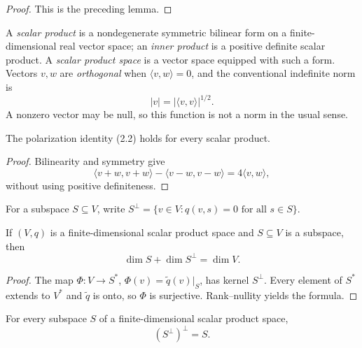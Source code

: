 \begin{proof}
\leanok
\sketch This is the preceding lemma.
\end{proof}

A \emph{scalar product} is a nondegenerate symmetric bilinear form on a
finite-dimensional real vector space; an \emph{inner product} is a positive
definite scalar product. A \emph{scalar product space} is a vector space equipped
with such a form. Vectors $v,w$ are \emph{orthogonal} when
$\langle v,w\rangle=0$, and the conventional indefinite norm is
\[
|v|=|\langle v,v\rangle|^{1/2}.
\]
A nonzero vector may be null, so this function is not a norm in the usual sense.

\begin{proposition}
\label{prop:polarization-scalar-product}
\leanok
{}
The polarization identity (2.2) holds for every scalar product.
\end{proposition}

\begin{proof}
\leanok
\sketch Bilinearity and symmetry give
\[
\langle v+w,v+w\rangle-\langle v-w,v-w\rangle=4\langle v,w\rangle,
\]
without using positive definiteness.
\end{proof}

For a subspace $S\subseteq V$, write
$S^\perp=\{v\in V:q(v,s)=0\text{ for all }s\in S\}$.

\begin{lemma}
\label{lem:orthogonal-complement}
\leanok
{}
If $(V,q)$ is a finite-dimensional scalar product space and $S\subseteq V$ is a
subspace, then
\[
\dim S+\dim S^\perp=\dim V.
\]
\end{lemma}

\begin{proof}
\leanok
\sketch The map
$\Phi\colon V\to S^*$, $\Phi(v)=\widetilde q(v)|_S$, has kernel $S^\perp$.
Every element of $S^*$ extends to $V^*$ and $\widetilde q$ is onto, so $\Phi$ is
surjective. Rank--nullity yields the formula.
\end{proof}

\begin{lemma}
\label{lem:orthogonal-complement-involution}
\leanok
{}
For every subspace $S$ of a finite-dimensional scalar product space,
\[
(S^\perp)^\perp=S.
\]
\end{lemma}

